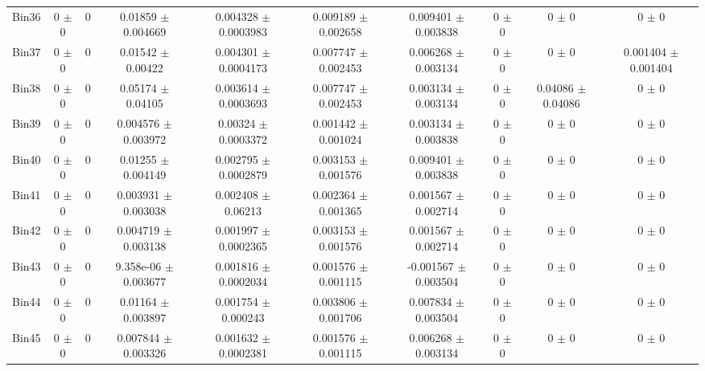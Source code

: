 \begin{tabular}{@{\extracolsep{4pt}}lccccccccc@{}}
     Bin36 & 0 $\pm$ 0 & 0 & 0.01859 $\pm$ 0.004669 & 0.004328 $\pm$ 0.0003983 & 0.009189 $\pm$ 0.002658 & 0.009401 $\pm$ 0.003838 & 0 $\pm$ 0 & 0 $\pm$ 0 & 0 $\pm$ 0 \\ 
     Bin37 & 0 $\pm$ 0 & 0 & 0.01542 $\pm$ 0.00422 & 0.004301 $\pm$ 0.0004173 & 0.007747 $\pm$ 0.002453 & 0.006268 $\pm$ 0.003134 & 0 $\pm$ 0 & 0 $\pm$ 0 & 0.001404 $\pm$ 0.001404 \\ 
     Bin38 & 0 $\pm$ 0 & 0 & 0.05174 $\pm$ 0.04105 & 0.003614 $\pm$ 0.0003693 & 0.007747 $\pm$ 0.002453 & 0.003134 $\pm$ 0.003134 & 0 $\pm$ 0 & 0.04086 $\pm$ 0.04086 & 0 $\pm$ 0 \\ 
     Bin39 & 0 $\pm$ 0 & 0 & 0.004576 $\pm$ 0.003972 & 0.00324 $\pm$ 0.0003372 & 0.001442 $\pm$ 0.001024 & 0.003134 $\pm$ 0.003838 & 0 $\pm$ 0 & 0 $\pm$ 0 & 0 $\pm$ 0 \\ 
     Bin40 & 0 $\pm$ 0 & 0 & 0.01255 $\pm$ 0.004149 & 0.002795 $\pm$ 0.0002879 & 0.003153 $\pm$ 0.001576 & 0.009401 $\pm$ 0.003838 & 0 $\pm$ 0 & 0 $\pm$ 0 & 0 $\pm$ 0 \\ 
     Bin41 & 0 $\pm$ 0 & 0 & 0.003931 $\pm$ 0.003038 & 0.002408 $\pm$ 0.06213 & 0.002364 $\pm$ 0.001365 & 0.001567 $\pm$ 0.002714 & 0 $\pm$ 0 & 0 $\pm$ 0 & 0 $\pm$ 0 \\ 
     Bin42 & 0 $\pm$ 0 & 0 & 0.004719 $\pm$ 0.003138 & 0.001997 $\pm$ 0.0002365 & 0.003153 $\pm$ 0.001576 & 0.001567 $\pm$ 0.002714 & 0 $\pm$ 0 & 0 $\pm$ 0 & 0 $\pm$ 0 \\ 
     Bin43 & 0 $\pm$ 0 & 0 & 9.358e-06 $\pm$ 0.003677 & 0.001816 $\pm$ 0.0002034 & 0.001576 $\pm$ 0.001115 & -0.001567 $\pm$ 0.003504 & 0 $\pm$ 0 & 0 $\pm$ 0 & 0 $\pm$ 0 \\ 
     Bin44 & 0 $\pm$ 0 & 0 & 0.01164 $\pm$ 0.003897 & 0.001754 $\pm$ 0.000243 & 0.003806 $\pm$ 0.001706 & 0.007834 $\pm$ 0.003504 & 0 $\pm$ 0 & 0 $\pm$ 0 & 0 $\pm$ 0 \\ 
     Bin45 & 0 $\pm$ 0 & 0 & 0.007844 $\pm$ 0.003326 & 0.001632 $\pm$ 0.0002381 & 0.001576 $\pm$ 0.001115 & 0.006268 $\pm$ 0.003134 & 0 $\pm$ 0 & 0 $\pm$ 0 & 0 $\pm$ 0 \\ 
\hline\hline
  \end{tabular}
